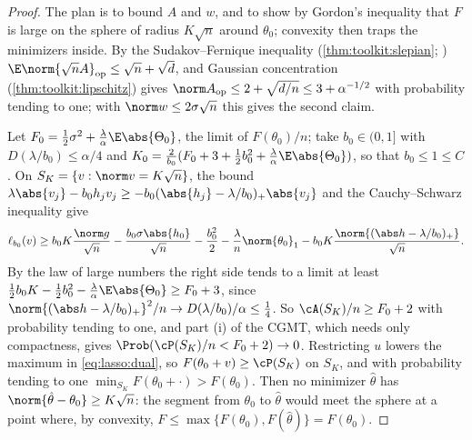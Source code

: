 \begin{refsection}

\begin{proof}
The plan is to bound $A$ and $w$, and to show by Gordon's inequality that $F$ is large on the sphere of radius $K\sqrt n$ around $\theta_0$; convexity then traps the minimizers inside. By the Sudakov--Fernique inequality (\cref{thm:toolkit:slepian}; \textcite[\S7.3]{Vershynin2018}) $\E\norm{\sqrt nA}_{\mathrm{op}}\le\sqrt n+\sqrt d$, and Gaussian concentration (\cref{thm:toolkit:lipschitz}) gives $\norm A_{\mathrm{op}}\le2+\sqrt{d/n}\le3+\alpha^{-1/2}$ with probability tending to one; with $\norm w\le2\sigma\sqrt n$ this gives the second claim.

Let $F_0=\frac12\sigma^2+\frac\lambda\alpha\E\abs{\Theta_0}$, the limit of $F(\theta_0)/n$; take $b_0\in(0,1]$ with $D(\lambda/b_0)\le\alpha/4$ and $K_0=\frac2{b_0}(F_0+3+\frac12b_0^2+\frac\lambda\alpha\E\abs{\Theta_0})$, so that $b_0\le1\le C$. On $S_K=\{v:\norm v=K\sqrt n\}$, the bound $\lambda\abs{v_j}-b_0h_jv_j\ge-b_0(\abs{h_j}-\lambda/b_0)_+\abs{v_j}$ and the Cauchy--Schwarz inequality give
\[
\ell_{b_0}(v)\ge b_0K\frac{\norm g}{\sqrt n}-\frac{b_0\sigma\abs{h_0}}{\sqrt n}-\frac{b_0^2}2-\frac\lambda n\norm{\theta_0}_1-b_0K\frac{\norm{(\abs h-\lambda/b_0)_+}}{\sqrt n}.
\]
By the law of large numbers the right side tends to a limit at least $\frac12b_0K-\frac12b_0^2-\frac\lambda\alpha\E\abs{\Theta_0}\ge F_0+3$, since $\norm{(\abs h-\lambda/b_0)_+}^2/n\to D(\lambda/b_0)/\alpha\le\frac14$. So $\cA(S_K)/n\ge F_0+2$ with probability tending to one, and part (i) of the CGMT, which needs only compactness, gives $\Prob(\cP(S_K)/n<F_0+2)\to0$. Restricting $u$ lowers the maximum in \eqref{eq:lasso:dual}, so $F(\theta_0+v)\ge\cP(S_K)$ on $S_K$, and with probability tending to one $\min_{S_K}F(\theta_0+\cdot)>F(\theta_0)$. Then no minimizer $\hat\theta$ has $\norm{\hat\theta-\theta_0}\ge K\sqrt n$: the segment from $\theta_0$ to $\hat\theta$ would meet the sphere at a point where, by convexity, $F\le\max\{F(\theta_0),F(\hat\theta)\}=F(\theta_0)$.
\end{proof}


\end{refsection}
